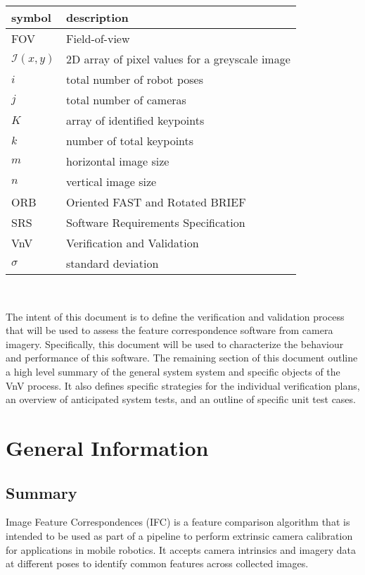 \documentclass[12pt, titlepage]{article}
\begin{document}
\renewcommand{\arraystretch}{1.2}
\begin{tabular}{l l} 
  \toprule		
  \textbf{symbol} & \textbf{description}\\
  \midrule
  FOV & Field-of-view\\
  $\mathcal{I}(x,y)$ & 2D array of pixel values for a greyscale image \\
  $i$ & total number of robot poses\\
  $j$ & total number of cameras\\
  $K$ & array of identified keypoints\\
  $k$ & number of total keypoints\\
  $m$ & horizontal image size\\
  $n$ & vertical image size\\
  ORB & Oriented FAST and Rotated BRIEF\\
  SRS & Software Requirements Specification\\
  VnV & Verification and Validation\\
  $\sigma$ & standard deviation\\
  \bottomrule
\end{tabular}\\

\newpage


The intent of this document is to define the verification and validation process 
that will be used to assess the feature correspondence software from camera 
imagery. Specifically, this document will be used to characterize the behaviour and 
performance of this software. The remaining section of this document outline a high 
level summary of the general system system and specific objects of the VnV process. 
It also defines specific strategies for the individual verification plans, an overview of 
anticipated system tests, and an outline of specific unit test cases.

\section{General Information}

\subsection{Summary}
Image Feature Correspondences (IFC) is a feature comparison algorithm that is intended 
to be used as part of a pipeline to perform extrinsic camera calibration for 
applications in mobile robotics. It accepts camera intrinsics and imagery data at different 
poses to identify common features across collected images. 
\end{document}
